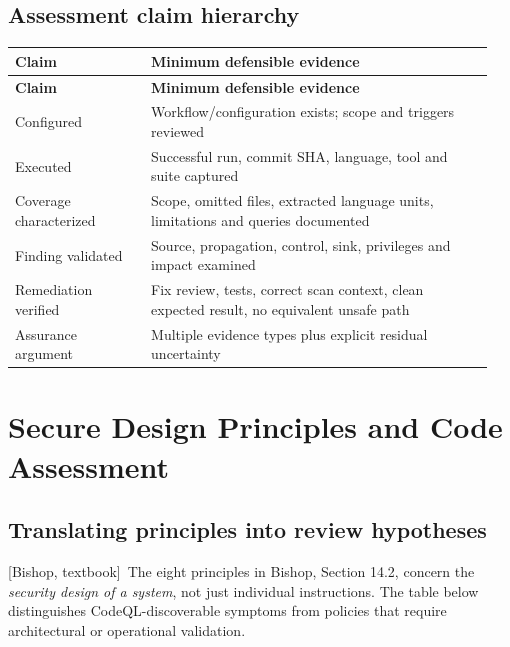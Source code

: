 \documentclass[11pt,letterpaper,oneside]{book}
\newcommand{\srcB}{\textsf{[Bishop, textbook]}}
\begin{document}
\section{Assessment claim hierarchy}

\small
\setlength{\tabcolsep}{2pt}
\renewcommand{\arraystretch}{1.18}
\begin{longtable}{>{\raggedright\arraybackslash}p{0.27\linewidth}>{\raggedright\arraybackslash}p{0.68\linewidth}}
\toprule
\textbf{Claim} & \textbf{Minimum defensible evidence}\\
\midrule
\endfirsthead
\toprule
\textbf{Claim} & \textbf{Minimum defensible evidence}\\
\midrule
\endhead
Configured & Workflow/configuration exists; scope and triggers reviewed\\
Executed & Successful run, commit SHA, language, tool and suite captured\\
Coverage characterized & Scope, omitted files, extracted language units, limitations and queries documented\\
Finding validated & Source, propagation, control, sink, privileges and impact examined\\
Remediation verified & Fix review, tests, correct scan context, clean expected result, no equivalent unsafe path\\
Assurance argument & Multiple evidence types plus explicit residual uncertainty\\
\bottomrule
\end{longtable}
\normalsize

\chapter{Secure Design Principles and Code Assessment}

\section{Translating principles into review hypotheses}

\srcB\ The eight principles in Bishop, Section 14.2, concern the \emph{security design of a system}, not just individual instructions. The table below distinguishes CodeQL-discoverable symptoms from policies that require architectural or operational validation.
\end{document}
